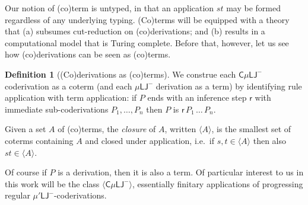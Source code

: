\documentclass[10pt,a4paper]{amsart}
\theoremstyle{plain}
\theoremstyle{definition}
\newtheorem{definition}[definition]{Definition}
\theoremstyle{plain}
\theoremstyle{definition} %
\newcommand{\closure}[1]{\langle #1 \rangle}
\newcommand{\infrule}{\mathsf{r}}
\newcommand{\rrule}{\infrule} %
\newcommand{\LJ}{\mathsf{LJ}}
\newcommand{\muLJ}{\mu\LJ}
\newcommand{\muLJnorec}{\mu'\LJ}
\newcommand{\muLJneg}{\muLJ^-}
\newcommand{\muLJnegnorec}{\muLJnorec^-}
\newcommand{\circular}{\mathsf C}
\newcommand{\cmuLJ}{\circular\muLJ}
\newcommand{\cmuLJneg}{\cmuLJ^-}
\newcommand{\der}{P}
\begin{document}
Our notion of (co)term is untyped, in that an application $st$ may be formed regardless of any underlying typing. 
(Co)terms will be equipped with a theory that (a) subsumes cut-reduction on (co)derivations; and (b) results in a computational model that is Turing complete.
Before that, however, let us see how (co)derivations can be seen as (co)terms.

\begin{definition}
    [(Co)derivations as (co)terms]
    We construe each $\cmuLJneg$ coderivation as a coterm (and each $\muLJneg$ derivation as a term) by identifying rule application with term application:
        if $\der$ ends with an inference step $\rrule$ with immediate sub-coderivations $\der_1 , \dots, \der_n$ 
        then $\der$ is $\rrule\, \der_1\, \dots \, \der_n$.
    
    Given a set $A$ of (co)terms, the \emph{closure} of $A$, written $\closure A$, is the smallest set of coterms containing $A$ and closed under application, i.e.\ if $s,t \in \closure A$ then also $st \in \closure A$.
\end{definition}

Of course if $\der$ is a derivation, then it is also a term.
Of particular interest to us in this work will be the class $\closure \cmuLJneg$, essentially finitary applications of progressing regular $\muLJnegnorec$-coderivations.
\end{document}
